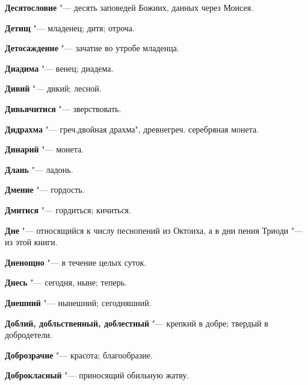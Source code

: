 \begin{mymulticols}{2}
\noindent\textbf{Десятословие} "--- десять заповедей Божиих, данных через Моисея. 




\noindent\textbf{Детищ} "--- младенец; дитя; отроча. 




\noindent\textbf{Детосаждение} "--- зачатие во утробе младенца. 




\noindent\textbf{Диадима} "--- венец; диадема. 




\noindent\textbf{Дивий} "--- дикий; лесной. 




\noindent\textbf{Дивьячитися} "--- зверствовать. 




\noindent\textbf{Дидрахма} "--- греч.двойная драхма", древнегреч. серебряная монета. 




\noindent\textbf{Динарий} "--- монета. 




\noindent\textbf{Длань} "--- ладонь. 




\noindent\textbf{Дмение} "--- гордость. 




\noindent\textbf{Дмитися} "--- гордиться; кичиться. 




\noindent\textbf{Дне} "--- относящийся к числу песнопений из Октоиха, а в дни пения Триоди "--- из этой книги. 




\noindent\textbf{Дненощно} "--- в течение целых суток. 




\noindent\textbf{Днесь} "--- сегодня, ныне; теперь. 




\noindent\textbf{Днешний} "--- нынешний; сегодняшний. 




\noindent\textbf{Доблий, добльственный, доблестный} "--- крепкий в добре; твердый в добродетели. 




\noindent\textbf{Доброзрачие} "--- красота; благообразие. 




\noindent\textbf{Доброкласный} "--- приносящий обильную жатву. 





\end{mymulticols}

